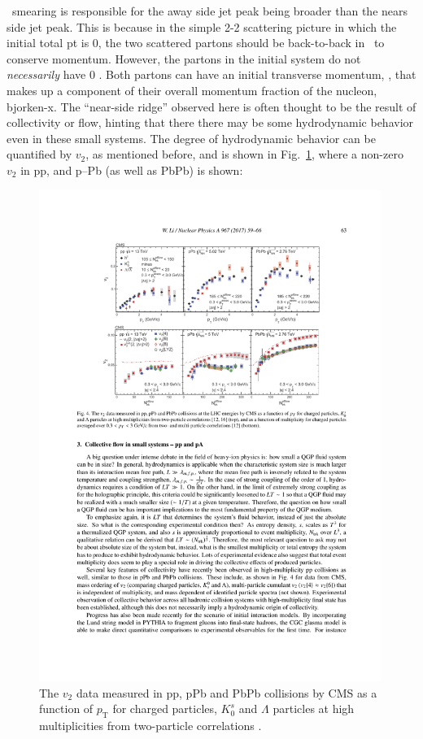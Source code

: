 \kt~smearing is responsible for the away side jet peak being broader than the nears side jet peak. This is because in the simple 2-2 scattering picture in which the initial total pt is 0, the two scattered partons should be back-to-back in \deltaphi~to conserve momentum. However, the partons in the initial system  do not \textit{necessarily} have 0 \pT. Both partons can have an initial transverse momentum, \kt, that makes up a component of their overall momentum fraction of the nucleon, bjorken-x. The ``near-side ridge'' observed here is often thought to be the result of collectivity or flow, hinting that there there may be some hydrodynamic behavior even in these small systems. The degree of hydrodynamic behavior can be quantified by $v_2$, as mentioned before, and is shown in Fig.~\ref{fig:small_systems_v2}, where a non-zero  $v_2$ in pp, and p--Pb (as well as PbPb) is shown:
\begin{figure}[htpb]
  \centering
  \includegraphics[width=0.99\textwidth]{Introduction/small_systems_flow.pdf}
  \caption{The $v_2$ data measured in pp, pPb and PbPb collisions by CMS as a function of $p_\mathrm{T}$ for charged particles, $K_0^s$ and $\Lambda$ particles at high multiplicities from two-particle correlations \cite{Khachatryan2017,Khachatryan2015}.}
  \label{fig:small_systems_v2}
\end{figure}


